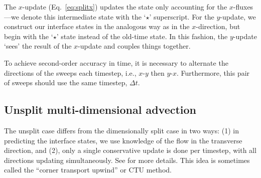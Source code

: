 The $x$-update
(Eq.~\ref{eq:splitx}) updates the state only accounting for the
$x$-fluxes---we denote this intermediate state with the `$\star$'
superscript.  For the $y$-update, we construct our interface states in
the analogous way as in the $x$-direction, but begin with the `$\star$'
state instead of the old-time state.  In this fashion, the $y$-update
`sees' the result of the $x$-update and couples things together.

To achieve second-order accuracy in time, it is necessary to alternate
the directions of the sweeps each timestep, i.e., $x$-$y$ then $y$-$x$.
Furthermore, this pair of sweeps should use the same timestep, $\Delta t$.


\subsection{Unsplit multi-dimensional advection}
\label{adv:sec:unsplit_2d}

The unsplit case differs from the dimensionally split case in two
ways: (1) in predicting the interface states, we use knowledge of the
flow in the transverse direction, and (2), only a single conservative
update is done per timestep, with all directions updating
simultaneously.  See \cite{colella:1990} for more details.  This idea
is sometimes called the ``corner transport upwind'' or CTU method.

